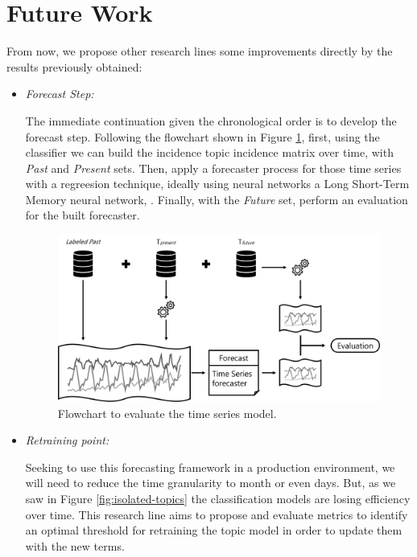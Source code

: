 \section{Future Work}

From now, we propose other research lines some improvements directly by the results previously obtained:

\begin{itemize}
	\item \textit{Forecast Step:}
	
	The immediate continuation given the chronological order is to develop the forecast step. Following the flowchart shown in Figure \ref{fig:forecast}, first, using the classifier we can build the incidence topic incidence matrix over time, with \textit{Past} and \textit{Present} sets. Then, apply a forecaster process for those time series with a regreesion technique, ideally using neural networks a Long Short-Term Memory neural network, \cite{hochreiter1997long}. Finally, with the \textit{Future} set, perform an evaluation for the built forecaster.
	
	\begin{figure}[h!]
		\centering
		\includegraphics[width=0.8\linewidth]{01.Chapters/04.Materials/forecast}
		\caption{Flowchart to evaluate the time series model.}
		\label{fig:forecast}
	\end{figure}
	
	\item \textit{Retraining point:}
	
	Seeking to use this forecasting framework in a production environment, we will need to reduce the time granularity to month or even days. But, as we saw in Figure \ref{fig:isolated-topics} the classification models are losing efficiency over time. This research line aims to propose and evaluate metrics to identify an optimal threshold for retraining the topic model in order to update them with the new terms.
	
	

\end{itemize}
